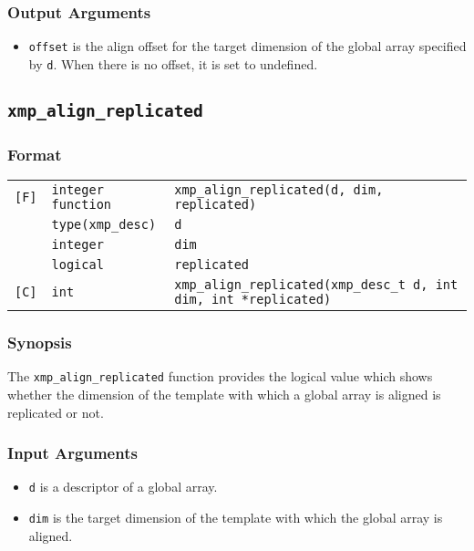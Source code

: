 \subsubsection*{Output Arguments}
\begin{itemize}
 \item {\tt offset} is the align offset for the target dimension of the
       global array specified by {\tt d}. When there is no offset, it is
       set to undefined.
\end{itemize}


\subsection{\tt xmp\_align\_replicated}

\subsubsection*{Format}

\begin{tabular}{lll}

\verb![F]!& {\tt integer function}& {\tt xmp\_align\_replicated(d, dim, replicated)}\\
          & {\tt type(xmp\_desc)} & {\tt d}\\
          & {\tt integer} & {\tt dim}\\
          & {\tt logical} & {\tt replicated}\\

\verb![C]!&  {\tt int}& {\tt xmp\_align\_replicated(xmp\_desc\_t d, int dim, int *replicated)}\\

\end{tabular}

\subsubsection*{Synopsis}

The {\tt xmp\_align\_replicated} function provides the logical value
which shows whether the dimension of the template with which a global
array is aligned is replicated or not. 


\subsubsection*{Input Arguments}
\begin{itemize}
 \item {\tt d} is a descriptor of a global array.
 \item {\tt dim} is the target dimension of the template with which the
       global array is aligned.
\end{itemize}

